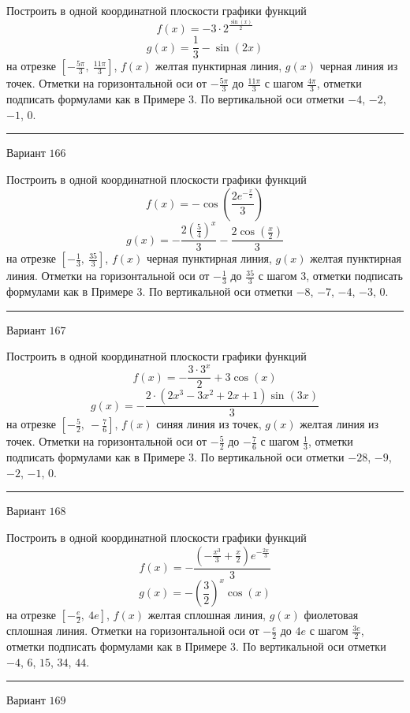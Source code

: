 \documentclass[11pt]{report}
\begin{document}
Построить в одной координатной плоскости графики функций $$f(x) = - 3 \cdot 2^{\frac{\sin{\left(x \right)}}{2}}$$ $$g(x) = \frac{1}{3} - \sin{\left(2 x \right)}$$ на отрезке $\left[- \frac{5 \pi}{3}, \  \frac{11 \pi}{3}\right]$, $f(x)$ желтая пунктирная линия, $g(x)$ черная линия из точек. Отметки на горизонтальной оси от $- \frac{5 \pi}{3}$ до $\frac{11 \pi}{3}$ с шагом $\frac{4 \pi}{3}$, отметки подписать формулами как в Примере 3. По вертикальной оси отметки $-4$, $-2$, $-1$, $0$.
\begin{center}
\noindent\rule{8cm}{0.4pt}
\end{center}
Вариант $166$


Построить в одной координатной плоскости графики функций $$f(x) = - \cos{\left(\frac{2 e^{- \frac{x}{2}}}{3} \right)}$$ $$g(x) = - \frac{2 \left(\frac{5}{4}\right)^{x}}{3} - \frac{2 \cos{\left(\frac{x}{2} \right)}}{3}$$ на отрезке $\left[- \frac{1}{3}, \  \frac{35}{3}\right]$, $f(x)$ черная пунктирная линия, $g(x)$ желтая пунктирная линия. Отметки на горизонтальной оси от $- \frac{1}{3}$ до $\frac{35}{3}$ с шагом $3$, отметки подписать формулами как в Примере 3. По вертикальной оси отметки $-8$, $-7$, $-4$, $-3$, $0$.
\begin{center}
\noindent\rule{8cm}{0.4pt}
\end{center}
Вариант $167$


Построить в одной координатной плоскости графики функций $$f(x) = - \frac{3 \cdot 3^{x}}{2} + 3 \cos{\left(x \right)}$$ $$g(x) = - \frac{2 \cdot \left(2 x^{3} - 3 x^{2} + 2 x + 1\right) \sin{\left(3 x \right)}}{3}$$ на отрезке $\left[- \frac{5}{2}, \  - \frac{7}{6}\right]$, $f(x)$ синяя линия из точек, $g(x)$ желтая линия из точек. Отметки на горизонтальной оси от $- \frac{5}{2}$ до $- \frac{7}{6}$ с шагом $\frac{1}{3}$, отметки подписать формулами как в Примере 3. По вертикальной оси отметки $-28$, $-9$, $-2$, $-1$, $0$.
\begin{center}
\noindent\rule{8cm}{0.4pt}
\end{center}
Вариант $168$


Построить в одной координатной плоскости графики функций $$f(x) = - \frac{\left(- \frac{x^{3}}{3} + \frac{x}{2}\right) e^{- \frac{2 x}{3}}}{3}$$ $$g(x) = - \left(\frac{3}{2}\right)^{x} \cos{\left(x \right)}$$ на отрезке $\left[- \frac{e}{2}, \  4 e\right]$, $f(x)$ желтая сплошная линия, $g(x)$ фиолетовая сплошная линия. Отметки на горизонтальной оси от $- \frac{e}{2}$ до $4 e$ с шагом $\frac{3 e}{2}$, отметки подписать формулами как в Примере 3. По вертикальной оси отметки $-4$, $6$, $15$, $34$, $44$.
\begin{center}
\noindent\rule{8cm}{0.4pt}
\end{center}
Вариант $169$
\end{document}
